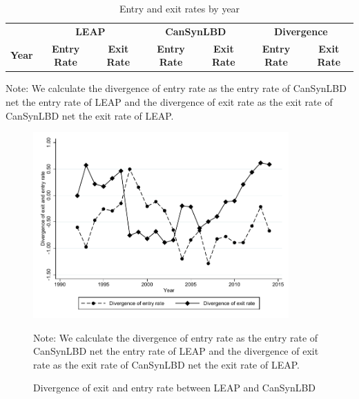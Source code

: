 \begin{table}[H]
  \centering
\begin{threeparttable}
 \caption{Entry and exit rates by year} \label{FirmDynamics} \medskip
\renewcommand{\arraystretch}{1}
\begin{tabular}{l|c c| c c| c c}
\toprule
&\multicolumn{2}{c|}{\textbf{LEAP}} &  \multicolumn{2}{c|}{\textbf{CanSynLBD}}&  \multicolumn{2}{c}{\textbf{Divergence}}\\
\textbf{Year}&\textbf{Entry Rate}&\textbf{Exit Rate}&\textbf{Entry Rate}&\textbf{Exit Rate} &\textbf{Entry Rate}&\textbf{Exit Rate}\\
\midrule

   \bottomrule
  \end{tabular} 
\begin{tablenotes}
\small
\item Note: \TableNote  We calculate the divergence of entry rate as the entry rate of CanSynLBD net the entry rate of LEAP and the divergence of exit rate as the exit rate of CanSynLBD net the exit rate of LEAP.
 \end{tablenotes}
 \end{threeparttable}
\end{table}

\begin{figure} [H]
\centering
\caption{Divergence of exit and entry rate between LEAP and CanSynLBD} \label{Divergence}
\includegraphics[height=2.8in, width=.7\linewidth]{graphs/Divergence_of_exit_and_entry_rate_between_LEAP_and_CanSynLBD_bw.pdf} 
\begin{minipage}{0.85\textwidth}
{\footnotesize Note: \TableNote  We calculate the divergence of entry rate as the entry rate of CanSynLBD net the entry rate of LEAP and the divergence of exit rate as the exit rate of CanSynLBD net the exit rate of LEAP. \par}
\end{minipage}
\end{figure}

